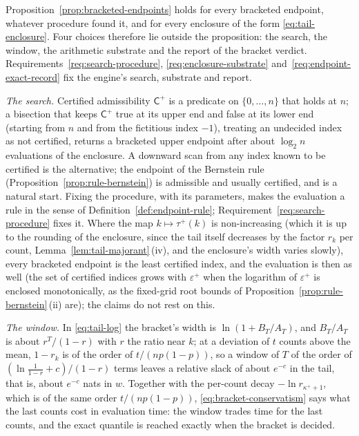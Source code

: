 \begin{remark}\label{rem:local-evaluation}
Proposition~\ref{prop:bracketed-endpoints} holds for every bracketed
endpoint, whatever procedure found it, and for every enclosure of the form
\eqref{eq:tail-enclosure}. Four choices therefore lie outside the
proposition: the search, the window, the arithmetic substrate and the report
of the bracket verdict. Requirements~\ref{req:search-procedure},
\ref{req:enclosure-substrate} and~\ref{req:endpoint-exact-record} fix the
engine's search, substrate and report.

\emph{The search.} Certified admissibility $\mathsf{C}^{+}$ is a predicate
on $\{0,\dots,n\}$ that holds at $n$; a bisection that keeps
$\mathsf{C}^{+}$ true at its upper end and false at its lower end (starting
from $n$ and from the fictitious index $-1$), treating an undecided index as
not certified, returns a bracketed upper endpoint after about $\log_2 n$
evaluations of the enclosure. A downward scan from any index known to be
certified is the alternative; the endpoint of the Bernstein rule
(Proposition~\ref{prop:rule-bernstein}) is admissible and usually certified,
and is a natural start. Fixing the procedure, with its parameters, makes the
evaluation a rule in the sense of Definition~\ref{def:endpoint-rule};
Requirement~\ref{req:search-procedure} fixes it. Where the map
$k\mapsto\tau^{+}(k)$ is non-increasing (which it is up to the rounding of
the enclosure, since the tail itself decreases by the factor $r_k$ per count,
Lemma~\ref{lem:tail-majorant}\,(iv), and the enclosure's width varies
slowly), every bracketed endpoint is the least certified index, and the
evaluation is then  as well (the set of certified
indices grows with $\varepsilon^{+}$ when the logarithm of
$\varepsilon^{+}$ is enclosed monotonically, as the fixed-grid root bounds of
Proposition~\ref{prop:rule-bernstein}\,(ii) are); the claims do not rest on
this.

\emph{The window.} In \eqref{eq:tail-log} the bracket's width is
$\ln(1+B_T/A_T)$, and $B_T/A_T$ is about $r^{T}/(1-r)$ with $r$ the ratio
near $k$; at a deviation of $t$ counts above the mean, $1-r_k$ is of the
order of $t/(np(1-p))$, so a window of $T$ of the order of
$(\ln\frac{1}{1-r}+c)/(1-r)$ terms leaves a relative slack of about
$e^{-c}$ in the tail, that is, about $e^{-c}$ nats in $w$. Together with the
per-count decay $-\ln r_{\kappa^{+}+1}$, which is of the same order
$t/(np(1-p))$, \eqref{eq:bracket-conservatism} says what the last counts
cost in evaluation time: the window trades time for the last counts, and
the exact quantile is reached exactly when the bracket is decided.


\end{remark}
